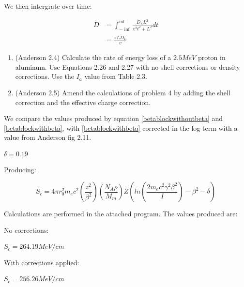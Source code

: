 \documentclass{hw}
\begin{document}
	We then intergrate over time:

	\begin{align*}
		D &= \int^{\inf}_{-\inf} \frac{\dot{D}_L L^2}{v^2 t^2 + L^2} dt \\
		&= \frac{\pi L \dot{D}_L}{v}
	\end{align*}

	\begin{enumerate}
		\item (Anderson 2.4) Calculate the rate of energy loss of a $ 2.5 MeV $ proton in aluminum. Use Equations 2.26 and 2.27 with no shell corrections or density corrections. Use the $ I_a $ value from Table 2.3.
		\item (Anderson 2.5) Amend the calculations of problem 4 by adding the shell correction and the effective charge correction.
	\end{enumerate}

\solution
	We compare the values produced by equation \ref{betablockwithoutbeta} and \ref{betablockwithbeta}, with \ref{betablockwithbeta} corrected in the log term with a value from Anderson fig 2.11.

	$ \delta = 0.19 $

	Producing:

	\[
	S_c = 4 \pi r_0^2 m_e c^2 \left( \frac{z^2}{\beta^2} \right) \left( \frac{N_A \rho}{M_m} \right) Z \left( ln \left( \frac{2 m_e c^2 \gamma^2 \beta^2}{I} \right) - \beta^2 - \delta \right)
	\]

	Calculations are performed in the attached program. The values produced are: 

	No corrections:

	$ S_c = 264.19 MeV/cm $

	With corrections applied:

	$ S_c = 256.26 MeV/cm $
\end{document}
